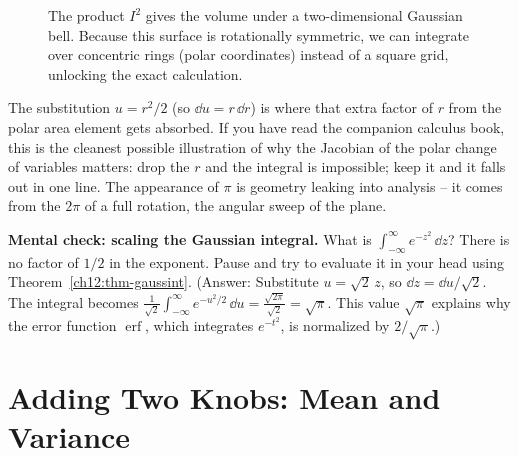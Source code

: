 \begin{figure}[H]
\centering
{}
\caption{The product $I^2$ gives the volume under a two-dimensional Gaussian bell. Because this surface is rotationally symmetric, we can integrate over concentric rings (polar coordinates) instead of a square grid, unlocking the exact calculation.}
\label{ch12:fig-gaussint-volume}
\end{figure}

\begin{connectionbox}
The substitution $u = r^2/2$ (so $\dd u = r\,\dd r$) is where that extra factor
of $r$ from the polar area element gets absorbed. If you have read the companion calculus
book, this is the cleanest possible illustration of why the Jacobian of the
polar change of variables matters: drop the $r$ and the integral is impossible;
keep it and it falls out in one line. The appearance of $\pi$ is geometry leaking
into analysis -- it comes from the $2\pi$ of a full rotation, the angular sweep of
the plane.
\end{connectionbox}

\begin{walkbox}
\textbf{Mental check: scaling the Gaussian integral.}
What is $\int_{-\infty}^{\infty} e^{-z^2}\,\dd z$? There is no factor of $1/2$ in the exponent. Pause and try to evaluate it in your head using
Theorem~\ref{ch12:thm-gaussint}. (Answer: Substitute $u = \sqrt{2}\,z$, so
$\dd z = \dd u/\sqrt{2}$. The integral becomes
$\frac{1}{\sqrt{2}}\int_{-\infty}^{\infty} e^{-u^2/2}\,\dd u = \frac{\sqrt{2\pi}}{\sqrt{2}} = \sqrt{\pi}$.
This value $\sqrt{\pi}$ explains why the error function $\operatorname{erf}$,
which integrates $e^{-t^2}$, is normalized by $2/\sqrt{\pi}$.)
\end{walkbox}

\section{Adding Two Knobs: Mean and Variance}
\label{ch12:general}

